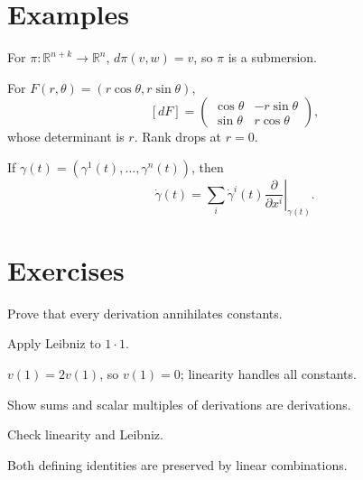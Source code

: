 \section{Examples}
\begin{example}[Projection]\label{ex:vii04-projection}
For \(\pi:\mathbb R^{n+k}\to\mathbb R^n\), \(d\pi(v,w)=v\), so \(\pi\) is a submersion.
\end{example}

\begin{example}\label{ex:vii04-polar}
For \(F(r,\theta)=(r\cos\theta,r\sin\theta)\),
\[
[dF]=
\begin{pmatrix}
\cos\theta&-r\sin\theta\\
\sin\theta&r\cos\theta
\end{pmatrix},
\]
whose determinant is \(r\). Rank drops at \(r=0\).
\end{example}

\begin{example}\label{ex:vii04-curve}
If \(\gamma(t)=(\gamma^1(t),\dots,\gamma^n(t))\), then
\[
\dot\gamma(t)=\sum_i\dot\gamma^i(t)
\left.\frac{\partial}{\partial x^i}\right|_{\gamma(t)}.
\]
\end{example}

\section{Exercises}
\begin{exercise}\label{exr:vii04-01}
Prove that every derivation annihilates constants.
\end{exercise}
\begin{hint}
Apply Leibniz to \(1\cdot1\).
\end{hint}
\begin{solution}
\(v(1)=2v(1)\), so \(v(1)=0\); linearity handles all constants.
\end{solution}

\begin{exercise}\label{exr:vii04-02}
Show sums and scalar multiples of derivations are derivations.
\end{exercise}
\begin{hint}
Check linearity and Leibniz.
\end{hint}
\begin{solution}
Both defining identities are preserved by linear combinations.
\end{solution}

